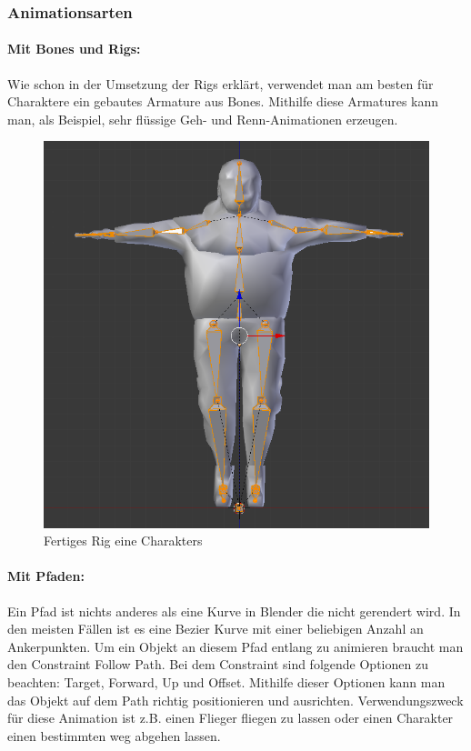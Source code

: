 \subsubsection{Animationsarten}

\paragraph{Mit Bones und Rigs:}
Wie schon in der Umsetzung der Rigs erklärt, verwendet man am besten für Charaktere ein gebautes Armature aus Bones.
Mithilfe diese Armatures kann man, als Beispiel, sehr flüssige Geh- und Renn-Animationen erzeugen.

\begin{figure}[H]
    \centering

    \includegraphics[width=.8\textwidth]{images/rigging_body.PNG}
    \caption{Fertiges Rig eine Charakters}
\end{figure}

\paragraph{Mit Pfaden:}
Ein Pfad ist nichts anderes als eine Kurve in Blender die nicht gerendert wird. In den meisten Fällen ist es eine Bezier Kurve mit einer beliebigen
Anzahl an Ankerpunkten. Um ein Objekt an diesem Pfad entlang zu animieren braucht man den Constraint \dq Follow Path\dq.
Bei dem Constraint sind folgende Optionen zu beachten: Target, Forward, Up und Offset. Mithilfe dieser Optionen kann man das Objekt auf dem Path richtig positionieren und ausrichten.
Verwendungszweck für diese Animation ist z.B. einen Flieger fliegen zu lassen oder einen Charakter einen bestimmten weg abgehen lassen.
\citep{Blender:FollowPath}

